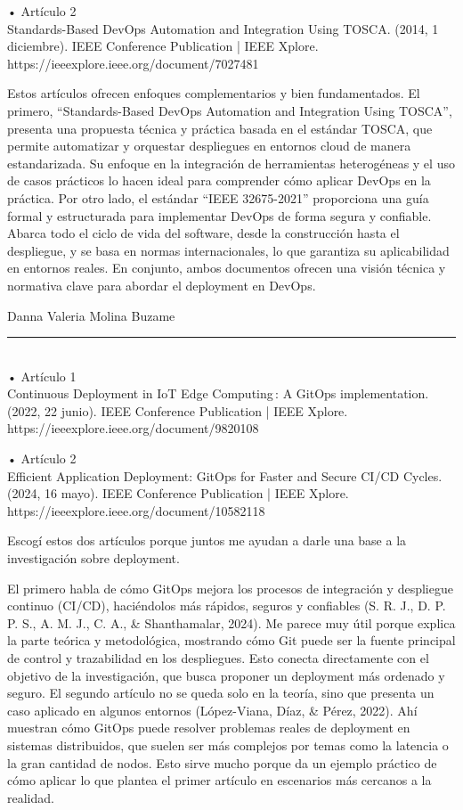 \documentclass[12pt,a4paper]{article}
\begin{document}
• Artículo 2 \\
Standards-Based DevOps Automation and Integration Using TOSCA. (2014, 1 diciembre). IEEE Conference Publication | IEEE Xplore. https://ieeexplore.ieee.org/document/7027481


Estos artículos  ofrecen enfoques complementarios y bien fundamentados. El primero, “Standards-Based DevOps Automation and Integration Using TOSCA”, presenta una propuesta técnica y práctica basada en el estándar TOSCA, que permite automatizar y orquestar despliegues en entornos cloud de manera estandarizada. Su enfoque en la integración de herramientas heterogéneas y el uso de casos prácticos lo hacen ideal para comprender cómo aplicar DevOps en la práctica. Por otro lado, el estándar “IEEE 32675-2021” proporciona una guía formal y estructurada para implementar DevOps de forma segura y confiable. Abarca todo el ciclo de vida del software, desde la construcción hasta el despliegue, y se basa en normas internacionales, lo que garantiza su aplicabilidad en entornos reales. En conjunto, ambos documentos ofrecen una visión técnica y normativa clave para abordar el deployment en DevOps.



\vspace{1.5cm}
Danna Valeria Molina Buzame \\
\rule{\linewidth}{0.3mm} \\
• Artículo 1 \\
Continuous Deployment in IoT Edge Computing : A GitOps implementation. (2022, 22 junio). IEEE Conference Publication | IEEE Xplore. https://ieeexplore.ieee.org/document/9820108

• Artículo 2 \\
Efficient Application Deployment: GitOps for Faster and Secure CI/CD Cycles. (2024, 16 mayo). IEEE Conference Publication | IEEE Xplore. https://ieeexplore.ieee.org/document/10582118


Escogí estos dos artículos porque juntos me ayudan a darle una base a la investigación sobre deployment.

 El primero habla de cómo GitOps mejora los procesos de integración y despliegue continuo (CI/CD), haciéndolos más rápidos, seguros y confiables (S. R. J., D. P. P. S., A. M. J., C. A., \& Shanthamalar, 2024). Me parece muy útil porque explica la parte teórica y metodológica, mostrando cómo Git puede ser la fuente principal de control y trazabilidad en los despliegues. Esto conecta directamente con el objetivo de la investigación, que busca proponer un deployment más ordenado y seguro.
El segundo artículo no se queda solo en la teoría, sino que presenta un caso aplicado en algunos entornos (López-Viana, Díaz, \& Pérez, 2022). Ahí muestran cómo GitOps puede resolver problemas reales de deployment en sistemas distribuidos, que suelen ser más complejos por temas como la latencia o la gran cantidad de nodos. Esto sirve mucho porque da un ejemplo práctico de cómo aplicar lo que plantea el primer artículo en escenarios más cercanos a la realidad.
\end{document}
